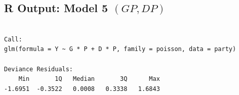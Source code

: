 \documentclass{article}\usepackage[]{graphicx}\usepackage[svgnames]{xcolor}
\makeatletter
\newenvironment{kframe}{%
 \def\at@end@of@kframe{}%
 \ifinner\ifhmode%
  \def\at@end@of@kframe{\end{minipage}}%
  \begin{minipage}{\columnwidth}%
 \fi\fi%
 \def\FrameCommand##1{\hskip\@totalleftmargin \hskip-\fboxsep
 \colorbox{shadecolor}{##1}\hskip-\fboxsep
     \hskip-\linewidth \hskip-\@totalleftmargin \hskip\columnwidth}%
 \MakeFramed {\advance\hsize-\width
   \@totalleftmargin\z@ \linewidth\hsize
   \@setminipage}}%
 {\par\unskip\endMakeFramed%
 \at@end@of@kframe}
\newenvironment{knitrout}{}{} %
\makeatother
\begin{document}
\subsection*{R Output: Model 5 $(GP, DP)$}

\begin{knitrout}
\color{fgcolor}\begin{kframe}
\begin{verbatim}

Call:
glm(formula = Y ~ G * P + D * P, family = poisson, data = party)

Deviance Residuals: 
    Min       1Q   Median       3Q      Max  
-1.6951  -0.3522   0.0008   0.3338   1.6843  


\end{verbatim}
\end{kframe}
\end{knitrout}
\end{document}
